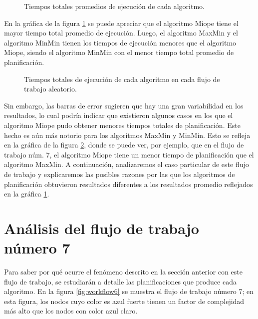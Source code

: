\begin{figure}
\begin{center}
\end{center}
\label{fig:tiempos_promedios}
\caption{Tiempos totales promedios de ejecución de cada algoritmo.}
\end{figure}

En la gráfica de la figura \ref{fig:tiempos_promedios} se puede apreciar que el algoritmo Miope tiene el mayor tiempo total promedio de ejecución. Luego, el algoritmo MaxMin y el algoritmo MinMin tienen los tiempos de ejecución menores que el algoritmo Miope, siendo el algoritmo MinMin con el menor tiempo total promedio de planificación.

\begin{figure}
\begin{center}
\end{center}
\label{fig:tiempos_totales}
\caption{Tiempos totales de ejecución de cada algoritmo en cada flujo de trabajo aleatorio.}
\end{figure}

Sin embargo, las barras de error sugieren que hay una gran variabilidad en los resultados, lo cual podría indicar que existieron algunos casos en los que el algoritmo Miope pudo obtener menores tiempos totales de planificación. Este hecho es aún más notorio para los algoritmos MaxMin y MinMin. Esto se refleja en la gráfica de la figura \ref{fig:tiempos_totales}, donde se puede ver, por ejemplo, que en el flujo de trabajo núm. 7, el algoritmo Miope tiene un menor tiempo de planificación que el algoritmo MaxMin. A continuación, analizaremos el caso particular de este flujo de trabajo y explicaremos las posibles razones por las que los algoritmos de planificación obtuvieron resultados diferentes a los resultados promedio reflejados en la gráfica \ref{fig:tiempos_promedios}.

\section{Análisis del flujo de trabajo número 7}
Para saber por qué ocurre el fenómeno descrito en la sección anterior con este flujo de trabajo, se estudiarán a detalle las planificaciones que produce cada algoritmo. En la figura \ref{fig:workflow6} se muestra el flujo de trabajo número 7; en esta figura, los nodos cuyo color es azul fuerte tienen un factor de complejidad más alto que los nodos con color azul claro.

